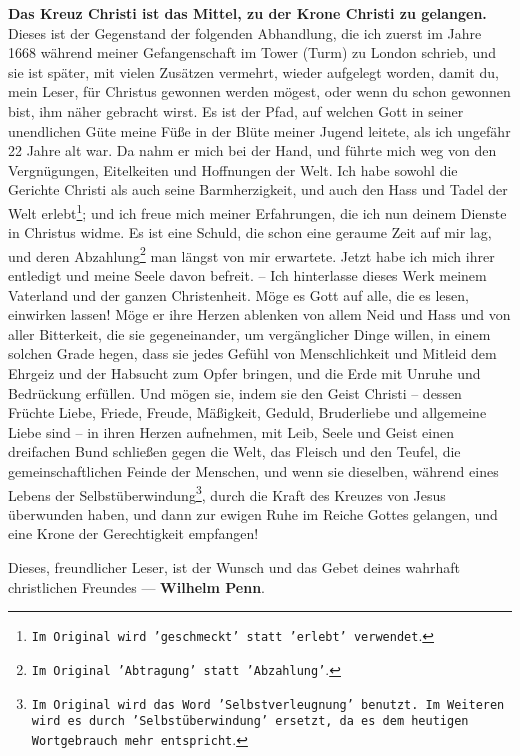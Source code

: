 \textbf{Das Kreuz Christi ist das Mittel, zu der Krone Christi zu gelangen.}
Dieses ist der Gegenstand der folgenden Abhandlung, die ich zuerst im Jahre 1668
während meiner Gefangenschaft  im Tower (Turm) zu London
 schrieb, und sie ist später, mit vielen Zusätzen vermehrt, wieder
aufgelegt worden, damit du, mein Leser, für Christus gewonnen werden mögest,
oder wenn du schon gewonnen bist, ihm näher gebracht wirst. Es ist der Pfad, auf
welchen Gott in seiner unendlichen Güte meine Füße in der Blüte meiner Jugend
leitete, als ich ungefähr 22 Jahre alt war. Da nahm er mich bei der Hand, und
führte mich weg von den Vergnügungen, Eitelkeiten und Hoffnungen der Welt. Ich
habe sowohl die Gerichte Christi als auch seine Barmherzigkeit, und auch den
Hass und Tadel der Welt erlebt\footnote{\texttt{Im Original wird 'geschmeckt'
statt 'erlebt' verwendet}.}; und ich freue mich meiner Erfahrungen, die ich nun
deinem
Dienste in Christus widme. Es ist eine Schuld, die schon eine geraume Zeit auf
mir lag, und deren Abzahlung\footnote{\texttt{Im Original 'Abtragung' statt
'Abzahlung'}.} man längst von mir erwartete. Jetzt habe ich mich ihrer
entledigt und meine Seele davon befreit. -- Ich hinterlasse dieses Werk meinem
Vaterland und der ganzen Christenheit. Möge es Gott auf alle, die es lesen,
einwirken lassen! Möge er ihre Herzen ablenken von allem Neid und Hass und von
aller Bitterkeit, die sie gegeneinander, um vergänglicher Dinge willen, in
einem solchen Grade hegen, dass sie jedes Gefühl von Menschlichkeit und Mitleid
dem Ehrgeiz und der Habsucht zum Opfer bringen, und die Erde mit Unruhe und
Bedrückung erfüllen. Und mögen sie, indem sie den Geist Christi -- dessen
Früchte Liebe, Friede, Freude, Mäßigkeit, Geduld, Bruderliebe und allgemeine
Liebe sind -- in ihren Herzen aufnehmen, mit Leib, Seele und Geist einen
dreifachen Bund schließen gegen die Welt, das Fleisch und den Teufel, die
gemeinschaftlichen Feinde der Menschen, und wenn sie dieselben, während eines
Lebens der Selbstüberwindung\footnote{\texttt{Im Original wird das Word
'Selbstverleugnung' benutzt. Im Weiteren wird es durch 'Selbstüberwindung'
ersetzt, da es dem heutigen Wortgebrauch mehr entspricht}.}, durch die Kraft des
Kreuzes von Jesus überwunden haben, und dann zur ewigen Ruhe im Reiche Gottes
gelangen, und eine Krone der Gerechtigkeit empfangen!


\medskip

Dieses, freundlicher Leser, ist der Wunsch und das Gebet deines wahrhaft
christlichen Freundes --- \textbf{Wilhelm Penn}.


